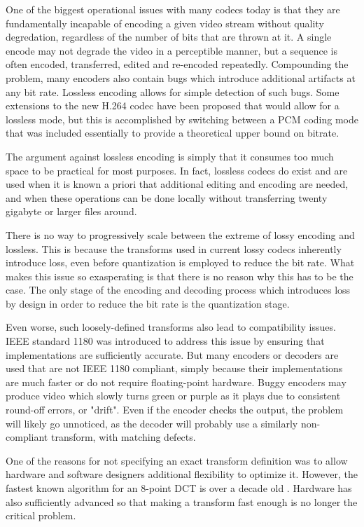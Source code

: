 \documentclass[11pt,letterpaper]{article}
\begin{document}
One of the biggest operational issues with many codecs today is that they are
 fundamentally incapable of encoding a given video stream without quality
 degredation, regardless of the number of bits that are thrown at it.
A single encode may not degrade the video in a perceptible manner, but a
 sequence is often encoded, transferred, edited and re-encoded repeatedly.
Compounding the problem, many encoders also contain bugs which introduce
 additional artifacts at any bit rate.
Lossless encoding allows for simple detection of such bugs.
Some extensions to the new H.264 codec have been proposed that would allow for
 a lossless mode, but this is accomplished by switching between a PCM coding
 mode that was included essentially to provide a theoretical upper bound on
 bitrate.

The argument against lossless encoding is simply that it consumes too much
 space to be practical for most purposes.
In fact, lossless codecs do exist and are used when it is known a priori that
 additional editing and encoding are needed, and when these operations can be
 done locally without transferring twenty gigabyte or larger files around.

There is no way to progressively scale between the extreme of lossy encoding
 and lossless.
This is because the transforms used in current lossy codecs inherently
 introduce loss, even before quantization is employed to reduce the bit rate.
What makes this issue so exasperating is that there is no reason why this has
 to be the case.
The only stage of the encoding and decoding process which introduces loss by
 design in order to reduce the bit rate is the quantization stage.

Even worse, such loosely-defined transforms also lead to compatibility issues.
IEEE standard 1180 was introduced to address this issue by ensuring that
 implementations are sufficiently accurate.
But many encoders or decoders are used that are not IEEE 1180 compliant, simply
 because their implementations are much faster or do not require floating-point
 hardware.
Buggy encoders may produce video which slowly turns green or purple as it plays
 due to consistent round-off errors, or "drift".
Even if the encoder checks the output, the problem will likely go unnoticed, as
 the decoder will probably use a similarly non-compliant transform, with
 matching defects.

One of the reasons for not specifying an exact transform definition was to
 allow hardware and software designers additional flexibility to optimize it.
However, the fastest known algorithm for an 8-point DCT is over a decade old
 \cite{LLM89}.
Hardware has also sufficiently advanced so that making a transform fast enough
 is no longer the critical problem.
\end{document}
